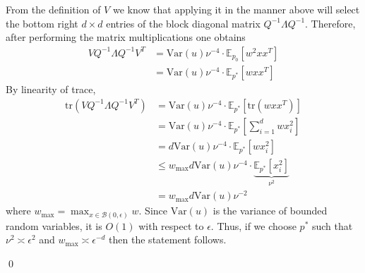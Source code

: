 \documentclass[11pt]{article}
\begin{document}
From the definition of $V$ we know that applying it in the manner above will select the bottom right $d\times d$ entries of the block diagonal matrix $Q^{-1}\Lambda Q^{-1}$. Therefore, after performing the matrix multiplications one obtains
\begin{align}
    VQ^{-1}\Lambda Q^{-1}V^T&= \text{Var}(u)\nu^{-4} \cdot \mathbb{E}_{p_0}\left[w^2xx^T\right] \\
    &= \text{Var}(u)\nu^{-4} \cdot \mathbb{E}_{p^*}\left[wxx^T\right]
\end{align}
By linearity of trace,
\begin{align}
    \text{tr}(VQ^{-1}\Lambda Q^{-1}V^T) &= \text{Var}(u)\nu^{-4} \cdot \mathbb{E}_{p^*}\left[\text{tr}(wxx^T)\right] \\
    &= \text{Var}(u)\nu^{-4} \cdot \mathbb{E}_{p^*}\left[\sum_{i = 1}^dwx_i^2\right] \\
    &= d\text{Var}(u)\nu^{-4} \cdot \mathbb{E}_{p^*}\left[wx_i^2\right] \\
    &\leq w_{\max}d\text{Var}(u)\nu^{-4} \cdot \underbrace{\mathbb{E}_{p^*}\left[x_i^2\right]}_{\nu^2} \\
    &= w_{\max}d\text{Var}(u)\nu^{-2}
\end{align}
where $w_{\max} = \max_{x\in \mathcal{B}(0, \epsilon)}w.$ Since $\text{Var}(u)$ is the variance of bounded random variables, it is $O(1)$ with respect to $\epsilon$. Thus, if we choose $p^*$ such that $\nu^2 \asymp \epsilon^2$ and $w_{\max} \asymp \epsilon^{-d}$ then the statement follows. 

\qed{}
\end{document}
